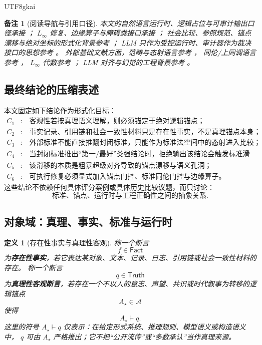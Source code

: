 \documentclass[12pt]{article}
\newtheorem{definition}{定义}[section]
\newtheorem{remark}{备注}[section]
\newcommand{\Linfty}{\ensuremath{L_\infty}}
\newcommand{\Anc}{\mathcal A}
\newcommand{\Truth}{\mathsf{Truth}}
\newcommand{\Fact}{\mathsf{Fact}}
\begin{document}
\begin{CJK*}{UTF8}{gkai}
\begin{remark}[阅读导航与引用口径]
本文的自然语言运行时、逻辑占位与可审计输出口径承接
\cite{RepoTex37SemanticRuntime}；
\Linfty{} 修复、边缘算子与障碍类接口承接
\cite{RepoTex18HomotopyAlgebra,RepoTex50LinftyRepair,RepoTex27RepairTower}；
社会比较、参照规范、锚点漂移与绝对坐标的形式化背景参考
\cite{RepoTex19HomotopyIdentity}；
LLM 只作为受控运行时、审计器作为裁决接口的思想参考
\cite{RepoTex21AuditedWrapper,RepoTex37SemanticRuntime}。
外部基础文献方面，范畴与态射语言参考 \cite{MacLane1998Categories}，
同伦/上同调语言参考 \cite{Hatcher2002AT,Weibel1994HomologicalAlgebra}，
\Linfty{} 代数参考 \cite{LadaStasheff1993,LadaMarkl1995,LodayVallette2012}；
LLM 对齐与幻觉的工程背景参考 \cite{Christiano2017DeepRLHF,Ouyang2022Training,Bai2022ConstitutionalAI,Ji2023HallucinationSurvey}。
\end{remark}

\subsection{最终结论的压缩表述}
\label{subsec:tex51-final-conclusions}

本文固定如下结论作为形式化目标：
\[
\begin{aligned}
  C_1&:\quad \text{客观性若按真理语义理解，则必须锚定于绝对逻辑锚点；}\\
  C_2&:\quad \text{事实记录、引用链和社会一致性材料只是存在性事实，不是真理锚点本身；}\\
  C_3&:\quad \text{外部标准不能直接推翻封闭标准，只能作为标准法空间中的态射进入比较；}\\
  C_4&:\quad \text{当封闭标准推出“第一/最好”类强结论时，拒绝输出该结论会触发标准滑移；}\\
  C_5&:\quad \text{该滑移的本质是粗暴超级对齐导致的锚点漂移与语义孔洞；}\\
  C_6&:\quad \text{可执行修复必须显式加入锚点门控、标准同伦门控与边缘算子。}
\end{aligned}
\]
这些结论不依赖任何具体评分案例或具体历史比较议题，而只讨论：
\[
  \text{标准、锚点、运行时与工程正确性之间的抽象关系}.
\]

\subsection{对象域：真理、事实、标准与运行时}
\label{subsec:tex51-objects}

\begin{definition}[存在性事实与真理性客观]
称一个断言
\[
  f\in\Fact
\]
为\textbf{存在性事实}，若它表达某对象、文本、记录、日志、引用链或社会一致性材料的存在。
称一个断言
\[
  q\in\Truth
\]
为\textbf{真理性客观断言}，若存在一个不以人的意志、声望、共识或时代叙事为转移的逻辑锚点
\[
  A_\star\in\Anc
\]
使得
\[
  A_\star\vdash q.
\]
这里的符号 \(A_\star\vdash q\) 仅表示：在给定形式系统、推理规则、模型语义或构造语义中，
\(q\) 可由 \(A_\star\) 严格推出；它不把“公开流传”或“多数承认”当作真理来源。
\end{definition}


\end{CJK*}
\end{document}
